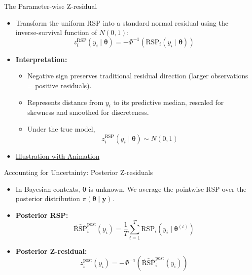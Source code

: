 \documentclass[
  ignorenonframetext,
]{beamer}
\providecommand{\tightlist}{%
  \setlength{\itemsep}{0pt}\setlength{\parskip}{0pt}}
\begin{document}
\begin{frame}{The Parameter-wise Z-residual}
\protect{}\label{the-parameter-wise-z-residual}
\begin{itemize}
\tightlist
\item
  Transform the uniform RSP into a standard normal residual using the
  inverse-survival function of \(N(0,1)\):
  \[ z_i^{\text{RSP}}(y_i \mid \boldsymbol{\theta}) = -\Phi^{-1}(\text{RSP}_i(y_i \mid \boldsymbol{\theta})) \]
\item
  \textbf{Interpretation:}

  \begin{itemize}
  \tightlist
  \item
    Negative sign preserves traditional residual direction (larger
    observations = positive residuals).
  \item
    Represents distance from \(y_i\) to its predictive median, rescaled
    for skewness and smoothed for discreteness.
  \item
    Under the true model,
    \[z_i^{\text{RSP}}(y_i \mid \boldsymbol{\theta})  \sim N(0,1)\]
  \end{itemize}
\item
  \href{https://tiw150.github.io/Zresidual/articles/illus_zresid.html}{Illustration
  with Animation}
\end{itemize}
\end{frame}

\begin{frame}{Accounting for Uncertainty: Posterior Z-residuals}
\protect{}\label{accounting-for-uncertainty-posterior-z-residuals}
\begin{itemize}
\tightlist
\item
  In Bayesian contexts, \(\boldsymbol{\theta}\) is unknown. We average
  the pointwise RSP over the posterior distribution
  \(\pi(\boldsymbol{\theta} \mid \mathbf{y})\).
\item
  \textbf{Posterior RSP:}
  \[ \widehat{\text{RSP}}_i^{\text{post}}(y_i) = \frac{1}{T} \sum_{t=1}^T \text{RSP}_i(y_i \mid \boldsymbol{\theta}^{(t)}) \]
\item
  \textbf{Posterior Z-residual:}
  \[ z_i^{\text{post}}(y_i) = -\Phi^{-1}\left(\widehat{\text{RSP}}_i^{\text{post}}(y_i)\right) \]
\end{itemize}
\end{frame}
\end{document}
